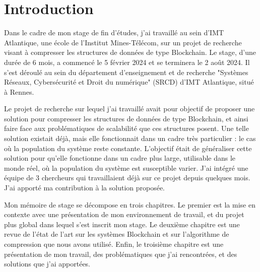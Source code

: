\chapter{Introduction}\label{chap:introduction}

	Dans le cadre de mon stage de fin d'études, j'ai travaillé au sein d'IMT
	Atlantique, une école de l'Institut Mines-Télécom, sur un projet de recherche
	visant à compresser les structures de données de type Blockchain. Le stage,
	d'une durée de 6 mois, a commencé le 5 février 2024 et se terminera le 2 août
	2024. Il s'est déroulé au sein du département d'enseignement et de recherche
	"Systèmes Réseaux, Cybersécurité et Droit du numérique" (SRCD) d'IMT
	Atlantique, situé à Rennes.

	Le projet de recherche sur lequel j'ai travaillé avait pour objectif de
	proposer une solution pour compresser les structures de données de type
	Blockchain, et ainsi faire face aux problématiques de scalabilité que ces
	structures posent. Une telle solution existait déjà, mais elle fonctionnait
	dans un cadre très particulier : le cas où la population du système reste
	constante. L'objectif était de généraliser cette solution pour qu'elle
	fonctionne dans un cadre plus large, utilisable dans le monde réel, où la
	population du système est susceptible varier. J'ai intégré une équipe de 3
	chercheurs qui travaillaient déjà sur ce projet depuis quelques mois. J'ai
	apporté ma contribution à la solution proposée.
	 
	Mon mémoire de stage se décompose en trois chapitres. Le premier est la mise
	en contexte avec une présentation de mon environnement de travail, et du
	projet plus global dans lequel s'est inscrit mon stage. Le deuxième chapitre
	est une revue de l'état de l'art sur les systèmes Blockchain et sur
	l'algorithme de compression que nous avons utilisé. Enfin, le troisième
	chapitre est une présentation de mon travail, des problématiques que j'ai
	rencontrées, et des solutions que j'ai apportées.